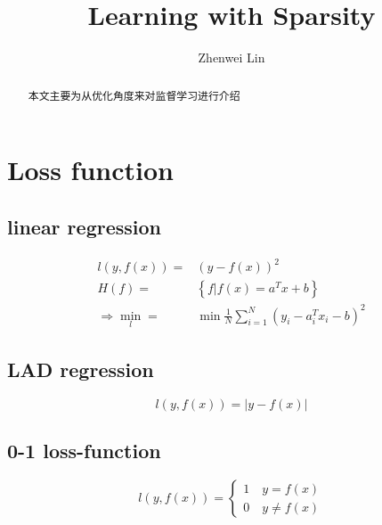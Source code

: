 \documentclass[lang=cn,11pt,a4paper]{elegantpaper}
\title{Learning with Sparsity}
\author{Zhenwei Lin }
\date{\zhtoday}
\theoremstyle{plain}
\theoremstyle{remark}
\begin{document}
\maketitle

\begin{abstract}
本文主要为从优化角度来对监督学习进行介绍
\end{abstract}

\section{Loss function}

\subsection{linear regression}
\begin{equation}\nonumber
    \begin{aligned}
        l(y,f(x)) =& (y-f(x))^2\\
        H(f) =& \left\{ f|f(x) = a^Tx+b \right\}\\
        \Rightarrow \min _{l} =& \min \frac{1}{N} \sum_{i=1}^{N}(y_i-a_i^Tx_i-b)^2
    \end{aligned}
\end{equation}

\subsection{LAD regression}
\begin{equation*}
    l(y,f(x)) = \left| y-f(x) \right| 
\end{equation*}
\subsection{0-1 loss-function}
\begin{equation*}
    l(y,f(x)) = \left\{\begin{array}{l}
        1\quad y=f(x)\\
        0\quad y \ne f(x)
    \end{array}\right.
\end{equation*}
\end{document}
